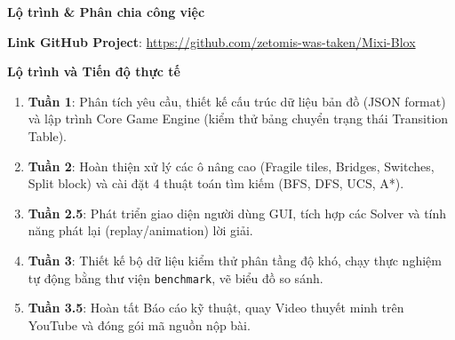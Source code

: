 \newpage

\thispagestyle{empty}

\begin{center}
    \Large\textbf{Lộ trình \& Phân chia công việc}
\end{center}

\noindent\textbf{Link GitHub Project}: \url{https://github.com/zetomis-was-taken/Mixi-Blox}

\vspace{1cm}

\noindent\textbf{Lộ trình và Tiến độ thực tế}
\begin{enumerate}
    \item \textbf{Tuần 1}: Phân tích yêu cầu, thiết kế cấu trúc dữ liệu bản đồ (JSON format) và lập trình Core Game Engine (kiểm thử bảng chuyển trạng thái Transition Table).
    \item \textbf{Tuần 2}: Hoàn thiện xử lý các ô nâng cao (Fragile tiles, Bridges, Switches, Split block) và cài đặt 4 thuật toán tìm kiếm (BFS, DFS, UCS, A*).
    \item \textbf{Tuần 2.5}: Phát triển giao diện người dùng GUI, tích hợp các Solver và tính năng phát lại (replay/animation) lời giải.
    \item \textbf{Tuần 3}: Thiết kế bộ dữ liệu kiểm thử phân tầng độ khó, chạy thực nghiệm tự động bằng thư viện \texttt{benchmark}, vẽ biểu đồ so sánh.
    \item \textbf{Tuần 3.5}: Hoàn tất Báo cáo kỹ thuật, quay Video thuyết minh trên YouTube và đóng gói mã nguồn nộp bài.
\end{enumerate}

